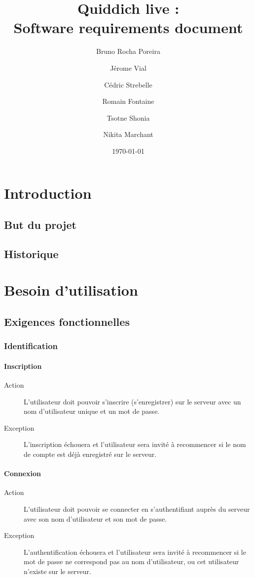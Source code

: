 \documentclass[a4paper]{article}
\title{Quiddich live : \\Software requirements document}
\author{Bruno Rocha Poreira \and Jérome Vial \and Cédric Strebelle \and
Romain Fontaine \and Tsotne Shonia \and Nikita Marchant}
\date{\today}
\begin{document}
\maketitle

\section{Introduction}
\subsection{But du projet}

\printglossary[numberedsection]
\subsection{Historique}

\section{Besoin d'utilisation}
\subsection{Exigences fonctionnelles}

\subsubsection{Identification}
\paragraph{Inscription}
\begin{description}
\item[Action] L'\gls{utilisateur} doit pouvoir s'inscrire (s'enregistrer) sur le \gls{serveur} avec un nom d'\gls{utilisateur} unique et un mot de passe.
\item[Exception] L'inscription échouera et l'\gls{utilisateur} sera invité à recommencer si le nom de compte est déjà enregistré sur le \gls{serveur}.
\end{description}

\paragraph{Connexion}
\begin{description}
\item[Action] L'\gls{utilisateur} doit pouvoir se connecter en s'authentifiant auprès du \gls{serveur} avec son nom d'\gls{utilisateur} et son mot de passe.
\item[Exception] L'authentification échouera et l'\gls{utilisateur} sera invité à recommencer si le mot de passe ne correspond pas au nom d'\gls{utilisateur}, ou cet \gls{utilisateur} n'existe sur le \gls{serveur}.
\end{description}
\end{document}
